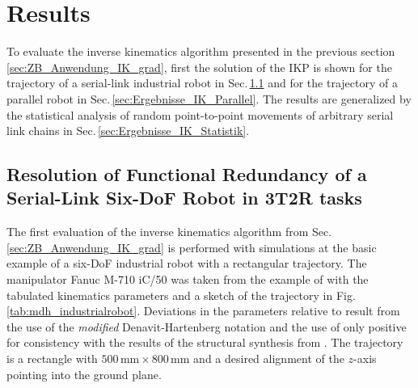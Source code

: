 \documentclass[robotics,article,submit,moreauthors,pdftex]{Definitions/mdpi}
\begin{document}
\section{Results}
\label{sec:Ergebnisse}

To evaluate the inverse kinematics algorithm presented in the previous section \ref{sec:ZB_Anwendung_IK_grad}, first the solution of the IKP is shown for the trajectory of a serial-link industrial robot in Sec.\,\ref{sec:Ergebnisse_Seriell} and for the trajectory of a parallel robot in Sec.\,\ref{sec:Ergebnisse_IK_Parallel}.
The results are generalized by the statistical analysis of random point-to-point movements of arbitrary serial link chains in Sec.\,\ref{sec:Ergebnisse_IK_Statistik}.

\subsection{Resolution of Functional Redundancy of a Serial-Link Six-DoF Robot in 3T2R tasks}
\label{sec:Ergebnisse_Seriell}


The first evaluation of the inverse kinematics algorithm from Sec.\,\ref{sec:ZB_Anwendung_IK_grad} is performed with simulations at the basic example of a six-DoF industrial robot with a rectangular trajectory.
The manipulator Fanuc M-710 iC/50 was taken from the example of \cite{HuoBar2008} with the tabulated kinematics parameters and a sketch of the trajectory in Fig.\,\ref{tab:mdh_industrialrobot}.
Deviations in the parameters relative to \cite{HuoBar2008} result from the use of the \emph{modified}  Denavit-Hartenberg notation  and the use of only positive  
 for consistency with the results of the structural synthesis from \cite{RamirezKotOrt2015}.
The trajectory is a rectangle with $500\,\mathrm{mm} \times 800\,\mathrm{mm}$ and a desired alignment of the $z$-axis pointing into the ground plane.
\end{document}
